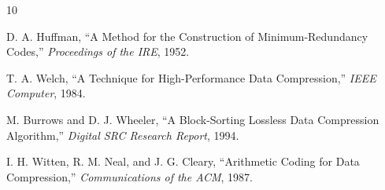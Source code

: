 \documentclass[12pt,a4paper]{article}
\begin{document}
\begin{thebibliography}{10}

D. A. Huffman, ``A Method for the Construction of Minimum-Redundancy Codes,'' \textit{Proceedings of the IRE}, 1952.

T. A. Welch, ``A Technique for High-Performance Data Compression,'' \textit{IEEE Computer}, 1984.

M. Burrows and D. J. Wheeler, ``A Block-Sorting Lossless Data Compression Algorithm,'' \textit{Digital SRC Research Report}, 1994.

I. H. Witten, R. M. Neal, and J. G. Cleary, ``Arithmetic Coding for Data Compression,'' \textit{Communications of the ACM}, 1987.

\end{thebibliography}
\end{document}
